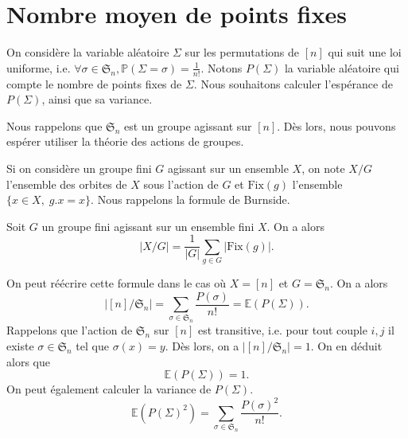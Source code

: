 \documentclass[..\main.tex]{subfiles}
\begin{document}
\section{Nombre moyen de points fixes}
On considère la variable aléatoire \(\Sigma\) sur les permutations de \([n]\) qui suit une loi uniforme, i.e. \(\forall \sigma\in \mathfrak{S}_n,\mathbb{P}(\Sigma = \sigma) = \frac{1}{n!}\).
Notons \(P(\Sigma)\) la variable aléatoire qui compte le nombre de points fixes de \(\Sigma\). 
Nous souhaitons calculer l'espérance de \(P(\Sigma)\), ainsi que sa variance.

Nous rappelons que \(\mathfrak{S}_n\) est un groupe agissant sur \([n]\). Dès lors, nous pouvons espérer utiliser la théorie des actions de groupes.


Si on considère un groupe fini \(G\) agissant sur un ensemble \(X\), on note \(X/G\) l'ensemble des orbites de \(X\) sous l'action de \(G\)
 et \(\mathrm{Fix}(g)\) l'ensemble \(\{x\in X,\; g.x = x\}\).
 Nous rappelons la formule de Burnside.
\begin{theorem}
    Soit \(G\) un groupe fini agissant sur un ensemble fini \(X\). On a alors
    \begin{equation}
        \lvert X/G\rvert = \frac{1}{\lvert G\rvert}\sum_{g\in G}\lvert \mathrm{Fix}(g)\rvert.
    \end{equation}
\end{theorem}
On peut réécrire cette formule dans le cas où \(X = [n]\) et \(G = \mathfrak{S}_n\). On a alors
\begin{equation}
    \lvert [n]/\mathfrak{S}_n\rvert = \sum_{\sigma\in \mathfrak{S}_n} \frac{P(\sigma)}{n!} = \mathbb{E}(P(\Sigma)).
\end{equation}
Rappelons que l'action de \(\mathfrak{S}_n\) sur \([n]\) est transitive, i.e. pour tout couple \(i,j\) il existe \(\sigma\in \mathfrak{S}_n\) tel que \(\sigma(x)=y\). Dès lors, on a \(\lvert [n]/\mathfrak{S}_n\rvert = 1\).
On en déduit alors que 
\begin{equation}
    \mathbb{E}(P(\Sigma)) = 1.
\end{equation}
On peut également calculer la variance de \(P(\Sigma)\).
\begin{equation}
    \mathbb{E}(P(\Sigma)^2) = \sum_{\sigma\in \mathfrak{S}_n} \frac{P(\sigma)^2}{n!}.
\end{equation}
\end{document}
